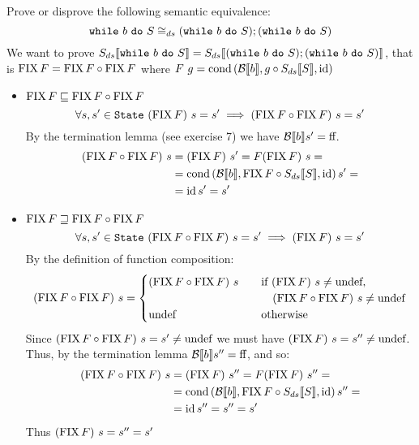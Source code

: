 \begin{exercise}{
    Prove or disprove the following semantic equivalence:
    \[ \wwhile{b}{S} \DScong (\wwhile{b}{S});(\wwhile{b}{S}) \]
}
    We want to prove $\Sds{\wwhile{b}{S}} = \Sds{(\wwhile{b}{S});(\wwhile{b}{S})}$, that is $\FIX F = \FIX F \circ \FIX F$ where $F\ g = \cond{\Bool{b}}{g \circ \Sds{S}}{\id}$
    \begin{itemize}
        \item $\FIX F \sqsubseteq \FIX F \circ \FIX F$
            \[ \forall s, s' \in \State\ (\FIX F)\ s = s' \implies (\FIX F \circ \FIX F)\ s = s' \]
            By the termination lemma (see exercise 7) we have $\Bool{b} s' = \False$.
            \begin{align*}
                (\FIX F \circ \FIX F)\ s &= (\FIX F)\ s' = F(\FIX F)\ s = \\
                &= \cond{\Bool{b}}{\FIX F \circ \Sds{S}}{\id} s' = \\
                &= \id s' = s'
            \end{align*}
        \item $\FIX F \sqsupseteq \FIX F \circ \FIX F$
            \[ \forall s, s' \in \State\ (\FIX F \circ \FIX F)\ s = s' \implies (\FIX F)\ s = s' \]
            By the definition of function composition:
            \[
                (\FIX F \circ \FIX F)\ s = \begin{cases}
                    (\FIX F \circ \FIX F)\ s &\quad \text{if } (\FIX F)\ s \neq \undef, \\
                        &\quad\quad (\FIX F \circ \FIX F)\ s \neq \undef \\
                    \undef &\quad \text{otherwise}
                \end{cases}
            \]
            Since $(\FIX F \circ \FIX F)\ s = s' \neq \undef$ we must have $(\FIX F)\ s = s'' \neq \undef$. Thus, by the termination lemma $\Bool{b} s'' = \False$, and so:
            \begin{align*}
                (\FIX F \circ \FIX F)\ s &= (\FIX F)\ s'' = F(\FIX F)\ s'' = \\
                &= \cond{\Bool{b}}{\FIX F \circ \Sds{S}}{\id} s'' = \\
                &= \id s'' = s'' = s'
            \end{align*}
            Thus $(\FIX F)\ s = s'' = s'$
    \end{itemize}
\end{exercise}
